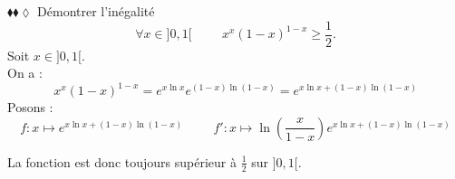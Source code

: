 \documentclass[11pt]{article}
\begin{document}
\begin{exercice}{$\blacklozenge\blacklozenge\lozenge$}{}
    Démontrer l'inégalité
    \begin{equation*}
        \forall{x\in]0,1[}\hspace{1cm}x^x(1-x)^{1-x}\geq\frac{1}{2}.
    \end{equation*}
    \tcblower
    Soit $x\in]0,1[$.\\
    On a :
    \begin{equation*}
        x^x(1-x)^{1-x}=e^{x\ln x}e^{(1-x)\ln(1-x)}=e^{x\ln{x}+(1-x)\ln(1-x)}
    \end{equation*}
    Posons :
    \begin{equation*}
        f:x\mapsto e^{x\ln{x}+(1-x)\ln(1-x)} \hspace{1cm} f':x\mapsto \ln\left(\frac{x}{1-x}\right)e^{x\ln{x}+(1-x)\ln(1-x)}
    \end{equation*}
    \begin{center}
    \end{center}
    La fonction est donc toujours supérieur à $\frac{1}{2}$ sur $]0,1[$.
\end{exercice}
\end{document}
